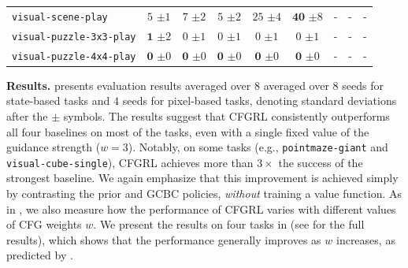 \documentclass{article}
\begin{document}
\begin{table}[t!]
{\begin{tabular}{lcccccccc}
\texttt{visual-scene-play} & $5$ {\tiny $\pm 1$} & $7$ {\tiny $\pm 2$} & $5$ {\tiny $\pm 2$} & $25$ {\tiny $\pm 4$} & $\mathbf{40}$ {\tiny $\pm 8$} & - & - & - \\
\texttt{visual-puzzle-3x3-play} & $\mathbf{1}$ {\tiny $\pm 2$} & $0$ {\tiny $\pm 1$} & $0$ {\tiny $\pm 1$} & $0$ {\tiny $\pm 1$} & $0$ {\tiny $\pm 1$} & - & - & - \\
\texttt{visual-puzzle-4x4-play} & $\mathbf{0}$ {\tiny $\pm 0$} & $\mathbf{0}$ {\tiny $\pm 0$} & $\mathbf{0}$ {\tiny $\pm 0$} & $\mathbf{0}$ {\tiny $\pm 0$} & $\mathbf{0}$ {\tiny $\pm 0$} & - & - & - \\

\bottomrule
\end{tabular}
}
\vspace{-1em}
\label{table:gcbc}
\end{table}

\textbf{Results.}  presents evaluation results averaged over $8$ averaged over $8$ seeds for state-based tasks and $4$ seeds for pixel-based tasks,
denoting standard deviations after the $\pm$ symbols.
The results suggest that CFGRL consistently outperforms all four baselines on most of the tasks,
even with a single fixed value of the guidance strength ($w=3$).
Notably, on some tasks (e.g., \texttt{pointmaze-giant} and \texttt{visual-cube-single}),
CFGRL achieves more than $3 \times$ the success of the strongest baseline.
We again emphasize that this improvement is achieved simply by contrasting the prior and GCBC policies, \emph{without} training a value function.
As in , we also measure how the performance of CFGRL varies with different values of CFG weights $w$.
We present the results on four tasks in  (see  for the full results),
which shows that the performance generally improves as $w$ increases, as predicted by .

 
\end{document}
